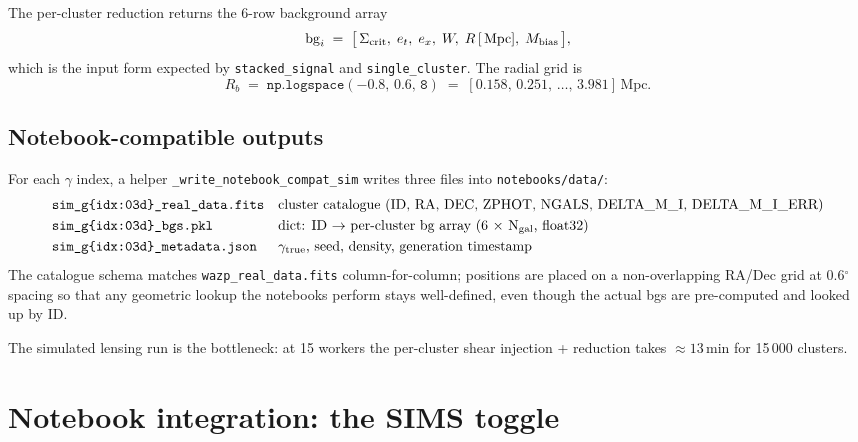 \documentclass[11pt,a4paper]{article}
\newcommand{\sigcrit}{\Sigma_{\rm crit}}
\newcommand{\Mpc}{\,\mathrm{Mpc}}
\begin{document}
The per-cluster reduction returns the 6-row background array
\begin{equation}
\mathrm{bg}_{i} \;=\;
\bigl[\,
\sigcrit,\;
e_{t},\;
e_{x},\;
W,\;
R\,[\Mpc],\;
M_{\rm bias}
\,\bigr],
\end{equation}
which is the input form expected by \verb|stacked_signal| and
\verb|single_cluster|. The radial grid is
\begin{equation}
R_{b} \;=\; \mathtt{np.logspace(-0.8,\,0.6,\,8)}
\;=\; [0.158,\, 0.251,\, \ldots,\, 3.981]\Mpc.
\end{equation}

\subsection{Notebook-compatible outputs}

For each $\gamma$ index, a helper
\verb|_write_notebook_compat_sim| writes three files into
\verb|notebooks/data/|:
\begin{align}
& \texttt{sim\_g\{idx:03d\}\_real\_data.fits}
&& \text{cluster catalogue (ID, RA, DEC, ZPHOT, NGALS, DELTA\_M\_I, DELTA\_M\_I\_ERR)}\\
& \texttt{sim\_g\{idx:03d\}\_bgs.pkl}
&& \text{dict: ID $\to$ per-cluster bg array (6 $\times$ N$_{\rm gal}$, float32)}\\
& \texttt{sim\_g\{idx:03d\}\_metadata.json}
&& \text{$\gamma_{\rm true}$, seed, density, generation timestamp}
\end{align}
The catalogue schema matches \verb|wazp_real_data.fits| column-for-column;
positions are placed on a non-overlapping RA/Dec grid at 0.6$^{\circ}$
spacing so that any geometric lookup the notebooks perform stays
well-defined, even though the actual bgs are pre-computed and looked up
by ID.

The simulated lensing run is the bottleneck: at 15 workers the per-cluster
shear injection + reduction takes $\approx 13$\,min for 15\,000 clusters.


\section{Notebook integration: the SIMS toggle}
\label{sec:notebooks}
\end{document}
